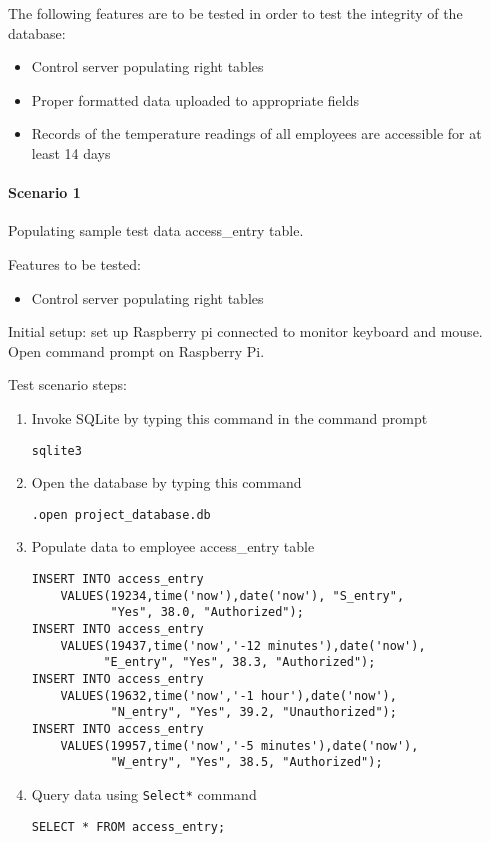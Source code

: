 The following features are to be tested in order to test the integrity of the
database:

\begin{itemize}
    \item Control server populating right tables 
    \item Proper formatted data uploaded to appropriate fields
    \item Records of the temperature readings of all employees are accessible
          for at least 14 days
\end{itemize}

\paragraph{Scenario 1}
Populating sample test data access\_entry table.

\noindent
Features to be tested:
\begin{itemize}
    \item Control server populating right tables
\end{itemize}

\noindent
Initial setup: set up Raspberry pi connected to monitor keyboard and mouse.
Open command prompt on Raspberry Pi.

\noindent
Test scenario steps:
\begin{enumerate}
    \item Invoke SQLite by typing this command in the command prompt
\begin{lstlisting}
sqlite3
\end{lstlisting}
    \item Open the database by typing this command 
\begin{listing}[H]
\begin{verbatim}
.open project_database.db
\end{verbatim}
\end{listing}
    \item Populate data to employee access\_entry table
\begin{listing}[H]
\begin{verbatim}
INSERT INTO access_entry
    VALUES(19234,time('now'),date('now'), "S_entry",
           "Yes", 38.0, "Authorized");
INSERT INTO access_entry
    VALUES(19437,time('now','-12 minutes'),date('now'),
          "E_entry", "Yes", 38.3, "Authorized");
INSERT INTO access_entry
    VALUES(19632,time('now','-1 hour'),date('now'),
           "N_entry", "Yes", 39.2, "Unauthorized");
INSERT INTO access_entry
    VALUES(19957,time('now','-5 minutes'),date('now'),
           "W_entry", "Yes", 38.5, "Authorized");
\end{verbatim}
\end{listing}
    \item Query data using \lstinline{Select*} command
\begin{listing}[H]
\begin{verbatim}
SELECT * FROM access_entry;
\end{verbatim}
\end{listing}
\end{enumerate}

